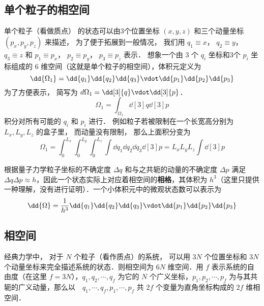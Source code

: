 
\begin{issues}
\issueDraft
\end{issues}

\subsection{单个粒子的相空间}

单个粒子（看做质点） 的状态可以由3个位置坐标 $(x,y,z)$ 和三个动量坐标 $(p_x, p_y, p_z)$ 来描述， 为了便于拓展到一般情况， 我们用 $q_1 \equiv x$，   $q_2 \equiv y$， $q_3 \equiv z$   和 $p_1 \equiv p_x$， $p_2 \equiv p_y$， $p_3 \equiv p_z$ 表示． 想象一个由 3 个 $q_i$  坐标和3个 $p_i$  坐标组成的 $6$ 维空间（这就是单个粒子的相空间），体积元定义为
\begin{equation}
\dd{\Omega_1} = \dd{q_1}\dd{q_2}\dd{q_3} \vdot \dd{p_1}\dd{p_2}\dd{p_3}
\end{equation} 
为了方便表示， 简写为  $d{\Omega_1} = \dd[3]{q} \vdot \dd[3]{p}$． 
\begin{equation}
\Omega_1 = \int_{\Omega_1} \dd[3]{q} \dd[3]{p}
\end{equation} 
积分对所有可能的 $q_i$ 和 $p_i$ 进行． 例如粒子若被限制在一个长宽高分别为 $L_x, L_y, L_z$ 的盒子里， 而动量没有限制， 那么上面积分变为
\begin{equation}
\Omega_1 = \int_0^{L_x} \int_0^{L_y} \int_0^{L_z} \int \dd{q_1} \dd{q_2} \dd{q_3} \dd[3]{p} = L_x L_y L_z\int \dd[3]{p} 
\end{equation} 

根据量子力学粒子坐标的不确定度 $\Delta q$ 和与之共轭的动量的不确定度 $\Delta p$ 满足 $\Delta q\Delta p\approx h$，因此一个状态实际上对应着相空间的\textbf{相格}，其体积为 $h^3$（这里只提供一种理解，没有进行证明）．一个小体积元中的微观状态数可以表示为
\begin{equation}
\dd{\Omega}=\frac{1}{h^3}\dd{q_1}\dd{q_2}\dd{q_3} \vdot \dd{p_1}\dd{p_2}\dd{p_3}
\end{equation}

\subsection{相空间}
经典力学中， 对于 $N$ 个粒子（看作质点）的系统， 可以用 $3N$ 个位置坐标和 $3N$ 个动量坐标来完全描述系统的状态．则相空间为 $6N$ 维空间．用 $f$ 表示系统的自由度（在这里 $f=3N$），$q_1,q_2,\cdots,q_f$ 为它的 $N$ 个广义坐标，$p_1,p_2,\cdots,p_f$ 为与其共轭的广义动量，那么以　$q_1,\cdots,q_f,p_1,\cdots,p_f$ 共 $2f$ 个变量为直角坐标构成的 $2f$ 维相空间．

